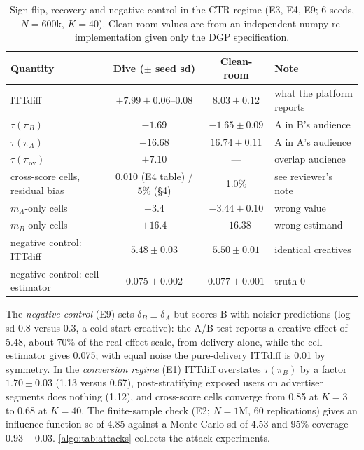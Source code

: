 \begin{table}[htbp]
\centering\small
\caption{Sign flip, recovery and negative control in the CTR regime (E3, E4, E9; 6 seeds, $N = 600$k, $K = 40$). Clean-room values are from an independent numpy re-implementation given only the DGP specification.}
\label{algo:tab:flip}
\begin{tabular}{lccl}
\toprule
Quantity & Dive ($\pm$ seed sd) & Clean-room & Note \\
\midrule
ITTdiff & $+7.99 \pm 0.06$--$0.08$ & $8.03 \pm 0.12$ & what the platform reports \\
$\tau(\pi_B)$ & $-1.69$ & $-1.65 \pm 0.09$ & A in B's audience \\
$\tau(\pi_A)$ & $+16.68$ & $16.74 \pm 0.11$ & A in A's audience \\
$\tau(\pi_{\mathrm{ov}})$ & $+7.10$ & --- & overlap audience \\
cross-score cells, residual bias & 0.010 (E4 table) / 5\% (\S4) & 1.0\% & see reviewer's note \\
$m_A$-only cells & $-3.4$ & $-3.44 \pm 0.10$ & wrong value \\
$m_B$-only cells & $+16.4$ & $+16.38$ & wrong estimand \\
negative control: ITTdiff & $5.48 \pm 0.03$ & $5.50 \pm 0.01$ & identical creatives \\
negative control: cell estimator & $0.075 \pm 0.002$ & $0.077 \pm 0.001$ & truth 0 \\
\bottomrule
\end{tabular}
\end{table}

The \emph{negative control} (E9) sets $\delta_B \equiv \delta_A$ but scores B with noisier predictions (log-sd 0.8 versus 0.3, a cold-start creative): the A/B test reports a creative effect of 5.48, about 70\% of the real effect scale, from delivery alone, while the cell estimator gives 0.075; with equal noise the pure-delivery ITTdiff is 0.01 by symmetry. In the \emph{conversion regime} (E1) ITTdiff overstates $\tau(\pi_B)$ by a factor $1.70 \pm 0.03$ (1.13 versus 0.67), post-stratifying exposed users on advertiser segments does nothing (1.12), and cross-score cells converge from 0.85 at $K = 3$ to 0.68 at $K = 40$. The finite-sample check (E2; $N = 1$M, 60 replications) gives an influence-function se of 4.85 against a Monte Carlo sd of 4.53 and 95\% coverage $0.93 \pm 0.03$. \cref{algo:tab:attacks} collects the attack experiments.

